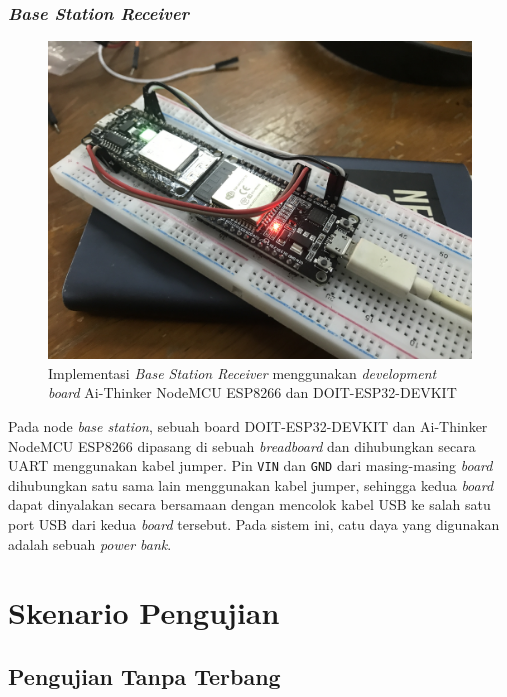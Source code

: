 \subsubsection{\textit{Base Station Receiver}}
\begin{figure}[H]
	\centering
	\includegraphics[scale=0.05]{./assets/BaseStation}
	\caption{Implementasi \textit{Base Station Receiver} menggunakan \textit{development board} Ai-Thinker NodeMCU ESP8266 dan DOIT-ESP32-DEVKIT}
\end{figure}

Pada node \textit{base station}, sebuah board DOIT-ESP32-DEVKIT dan Ai-Thinker NodeMCU ESP8266 dipasang di sebuah \textit{breadboard} dan dihubungkan secara UART menggunakan kabel jumper. Pin \verb|VIN| dan \verb|GND| dari masing-masing \textit{board} dihubungkan satu sama lain menggunakan kabel jumper, sehingga kedua \textit{board} dapat dinyalakan secara bersamaan dengan mencolok kabel USB ke salah satu port USB dari kedua \textit{board} tersebut. Pada sistem ini, catu daya yang digunakan adalah sebuah \textit{power bank}.

\section{Skenario Pengujian}
\subsection{Pengujian Tanpa Terbang}

